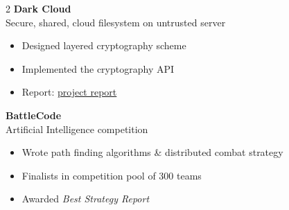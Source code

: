 \documentclass{article}
\newenvironment{changemargin}[2]{%
  \begin{list}{}{%
    \setlength{\topsep}{0pt}%
    \setlength{\leftmargin}{#1}%
    \setlength{\rightmargin}{#2}%
    \setlength{\listparindent}{\parindent}%
    \setlength{\itemindent}{\parindent}%
    \setlength{\parsep}{\parskip}%
  }%
  \item[]}{\end{list}
}
\newenvironment{body} {
	\vspace*{-16pt}
	\begin{changemargin}{-0.25in}{-0.5in}
  }	
	{\end{changemargin}
}
\begin{document}
\begin{body}
\begin{multicols}{2}
		\textbf {Dark Cloud}\\
		Secure, shared, cloud filesystem on untrusted server \\
		\vspace*{-3pt}
		\begin{itemize} \itemsep -2pt
			\item Designed layered cryptography scheme
			\item Implemented the cryptography API
            \item Report: \href{https://css.csail.mit.edu/6.858/2013/projects/mpolanco-pcattori-brando90.pdf}{project report}
		\end{itemize}
		\vspace{5pt}
		
		\textbf {BattleCode} \\
		Artificial Intelligence competition\\
		\vspace*{-3pt}
		\begin{itemize} \itemsep -2pt
			\item Wrote path finding algorithms \& distributed combat strategy
			\item Finalists in competition pool of 300 teams
			\item Awarded \emph{Best Strategy Report}
		\end{itemize}
	\end{multicols}
\end{body}


\end{document}
